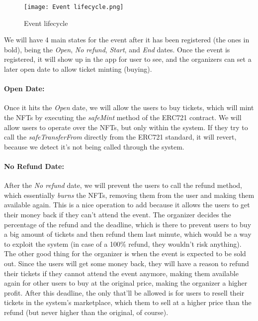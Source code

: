 \begin{figure}[H]
	\texttt{[image: Event lifecycle.png]}
	\centering
	\caption{Event lifecycle}
	\label{fig:event_lifecycle}
\end{figure}

We will have 4 main states for the event after it has been registered (the ones
in bold), being the \textit{Open}, \textit{No refund}, \textit{Start}, and
\textit{End} dates. Once the event is registered, it will show up in the app
for user to see, and the organizers can set a later open date to allow ticket
minting (buying).

\paragraph{Open Date:} Once it hits the \textit{Open} date, we will allow the users to buy tickets,
which will mint the NFTs by executing the \textit{safeMint} method of the
ERC721 contract. We will allow users to operate over the NFTs, but only within
the system. If they try to call the \textit{safeTransferFrom} directly from the
ERC721 standard, it will revert, because we detect it's not being called
through the system.

\paragraph{No Refund Date:} After the \textit{No refund} date, we will prevent the users to call the refund
method, which essentially \textit{burns} the NFTs, removing them from the user
and making them available again. This is a nice operation to add because it
allows the users to get their money back if they can't attend the event. The
organizer decides the percentage of the refund and the deadline, which is there
to prevent users to buy a big amount of tickets and then refund them last
minute, which would be a way to exploit the system (in case of a 100\% refund,
they wouldn't risk anything). The other good thing for the organizer is when
the event is expected to be sold out. Since the users will get some money back,
they will have a reason to refund their tickets if they cannot attend the event
anymore, making them available again for other users to buy at the original
price, making the organizer a higher profit. After this deadline, the only
that'll be allowed is for users to resell their tickets in the system's
marketplace, which them to sell at a higher price than the refund (but never
higher than the original, of course).

